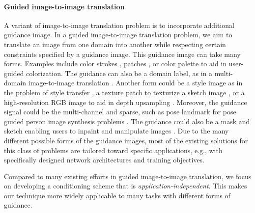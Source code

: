\documentclass[10pt,twocolumn,letterpaper]{article}
\newlength\paramargin
\begin{document}
\paragraph{Guided image-to-image translation}
A variant of image-to-image translation problem is to incorporate additional guidance image. In a guided image-to-image translation problem, we aim to translate an image from one domain into another while respecting certain constraints specified by a guidance image. This guidance image can take many forms. Examples include color strokes \cite{levin2004colorization, luan2007natural}, patches \cite{zhang2017real}, or color palette \cite{chang2015palette} to aid in user-guided colorization. The guidance can also be a domain label, as in a multi-domain image-to-image translation \cite{choi2017stargan}. Another form could be a style image as in the problem of style transfer \cite{dumoulin2017learned, ghiasi2017exploring, huang2017arbitrary}, a texture patch to texturize a sketch image \cite{xian2018texturegan}, or a high-resolution RGB image to aid in depth upsampling \cite{liu2018image,li2017joint}. Moreover, the guidance signal could be the multi-channel and sparse, such as pose landmark for pose guided person image synthesis problems \cite{ma2017pose,ma2018disentangled,siarohin2018deformable,neverova2018dense}. 
The guidance could also be a mask and sketch enabling users to inpaint and manipulate images \cite{yu2018free}. 
Due to the many different possible forms of the guidance images, most of the existing solutions for this class of problems are tailored toward specific applications, e.g., with specifically designed network architectures and training objectives.

Compared to many existing efforts in guided image-to-image translation, we focus on developing a conditioning scheme that is \emph{application-independent}. This makes our technique more widely applicable to many tasks with different forms of guidance.



\vspace{\paramargin}
\end{document}

